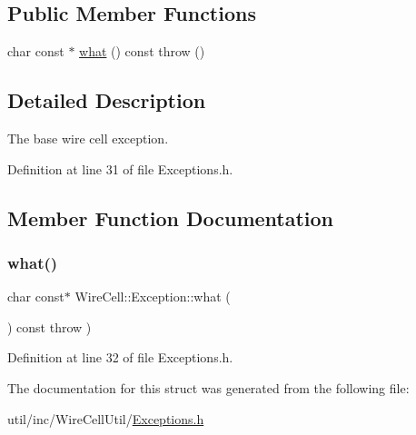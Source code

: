 \subsection*{Public Member Functions}
\begin{DoxyCompactItemize}
\item 
char const  $\ast$ \hyperlink{struct_wire_cell_1_1_exception_a4dbf194944acb08290f38306e09e23b6}{what} () const  throw ()
\end{DoxyCompactItemize}


\subsection{Detailed Description}
The base wire cell exception. 

Definition at line 31 of file Exceptions.\+h.



\subsection{Member Function Documentation}
\mbox{\label{struct_wire_cell_1_1_exception_a4dbf194944acb08290f38306e09e23b6}} 
\subsubsection{\texorpdfstring{what()}{what()}}
{\footnotesize\ttfamily char const$\ast$ Wire\+Cell\+::\+Exception\+::what (\begin{DoxyParamCaption}{ }\end{DoxyParamCaption}) const throw  ) \hspace{0.3cm}{\ttfamily [inline]}}



Definition at line 32 of file Exceptions.\+h.



The documentation for this struct was generated from the following file\+:\begin{DoxyCompactItemize}
\item 
util/inc/\+Wire\+Cell\+Util/\hyperlink{_exceptions_8h}{Exceptions.\+h}\end{DoxyCompactItemize}
